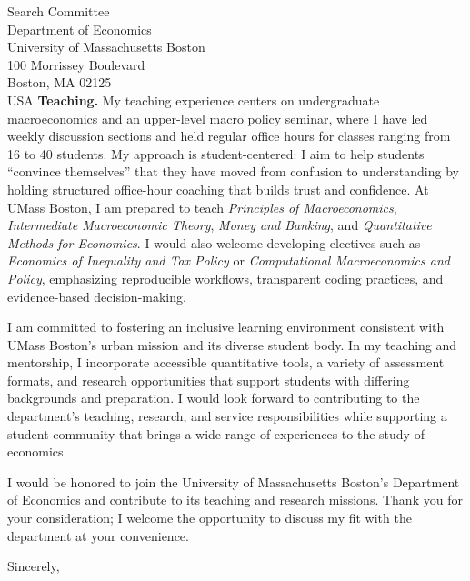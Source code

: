 \documentclass[11pt,letterpaper]{letter}
\begin{document}
\begin{letter}{Search Committee \\
Department of Economics \\
University of Massachusetts Boston \\
100 Morrissey Boulevard \\
Boston, MA 02125 \\ USA}
\textbf{Teaching.} My teaching experience centers on undergraduate macroeconomics and an upper-level macro policy seminar, where I have led weekly discussion sections and held regular office hours for classes ranging from 16 to 40 students. My approach is student-centered: I aim to help students “convince themselves” that they have moved from confusion to understanding by holding structured office-hour coaching that builds trust and confidence. At UMass Boston, I am prepared to teach \textit{Principles of Macroeconomics}, \textit{Intermediate Macroeconomic Theory}, \textit{Money and Banking}, and \textit{Quantitative Methods for Economics}. I would also welcome developing electives such as \textit{Economics of Inequality and Tax Policy} or \textit{Computational Macroeconomics and Policy}, emphasizing reproducible workflows, transparent coding practices, and evidence-based decision-making.

I am committed to fostering an inclusive learning environment consistent with UMass Boston’s urban mission and its diverse student body. In my teaching and mentorship, I incorporate accessible quantitative tools, a variety of assessment formats, and research opportunities that support students with differing backgrounds and preparation. I would look forward to contributing to the department’s teaching, research, and service responsibilities while supporting a student community that brings a wide range of experiences to the study of economics.

I would be honored to join the University of Massachusetts Boston’s Department of Economics and contribute to its teaching and research missions. Thank you for your consideration; I welcome the opportunity to discuss my fit with the department at your convenience.

\closing{Sincerely,}

\end{letter}
\end{document}
